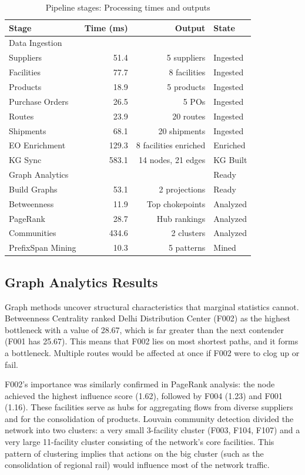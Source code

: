 \documentclass[conference]{IEEEtran}
\begin{document}
\begin{table}[!t]
\centering
\caption{Pipeline stages: Processing times and outputs}
\small
\begin{tabular}{@{}lrrl@{}}
\toprule
\textbf{Stage} & \textbf{Time (ms)} & \textbf{Output} & \textbf{State} \\
\midrule
Data Ingestion & & & \\
\quad Suppliers & 51.4 & 5 suppliers & Ingested \\
\quad Facilities & 77.7 & 8 facilities & Ingested \\
\quad Products & 18.9 & 5 products & Ingested \\
\quad Purchase Orders & 26.5 & 5 POs & Ingested \\
\quad Routes & 23.9 & 20 routes & Ingested \\
\quad Shipments & 68.1 & 20 shipments & Ingested \\
\midrule
EO Enrichment & 129.3 & 8 facilities enriched & Enriched \\
\midrule
KG Sync & 583.1 & 14 nodes, 21 edges & KG Built \\
\midrule
Graph Analytics & & & Ready \\
\quad Build Graphs & 53.1 & 2 projections & Ready \\
\quad Betweenness & 11.9 & Top chokepoints & Analyzed \\
\quad PageRank & 28.7 & Hub rankings & Analyzed \\
\quad Communities & 434.6 & 2 clusters & Analyzed \\
\midrule
PrefixSpan Mining & 10.3 & 5 patterns & Mined \\
\bottomrule
\end{tabular}
\label{tab:pipeline}
\end{table}

\subsection{Graph Analytics Results}
Graph methods uncover structural characteristics that marginal statistics cannot. Betweenness Centrality ranked Delhi Distribution Center (F002) as the highest bottleneck with a value of 28.67, which is far greater than the next contender (F001 has 25.67). This means that F002 lies on most shortest paths, and it forms a bottleneck. Multiple routes would be affected at once if F002 were to clog up or fail.

F002's importance was similarly confirmed in PageRank analysis: the node achieved the highest influence score (1.62), followed by F004 (1.23) and F001 (1.16). These facilities serve as hubs for aggregating flows from diverse suppliers and for the consolidation of products. Louvain community detection divided the network into two clusters: a very small 3-facility cluster (F003, F104, F107) and a very large 11-facility cluster consisting of the network's core facilities. This pattern of clustering implies that actions on the big cluster (such as the consolidation of regional rail) would influence most of the network traffic.
\end{document}
